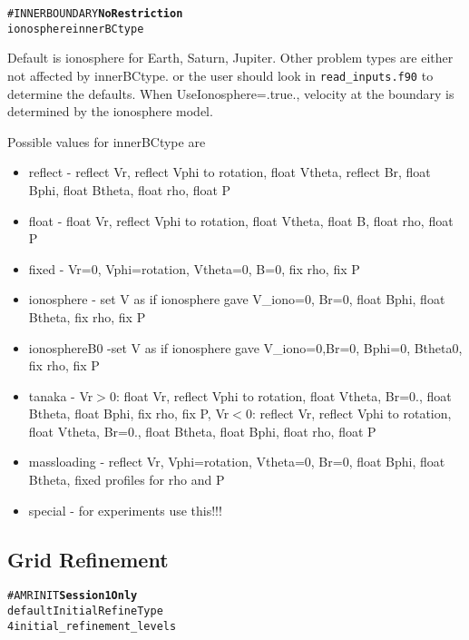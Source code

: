 \begin{alltt}
#INNERBOUNDARY \hfill {\bf No Restriction}
ionosphere             innerBCtype 
\end{alltt}

Default is ionosphere for  Earth, Saturn, Jupiter.  Other problem types are 
either not affected by innerBCtype. or the user should look in {\tt read\_inputs.f90}
to determine the defaults.  When UseIonosphere=.true., 
velocity at the boundary is determined by the ionosphere model.

Possible values for innerBCtype are

\begin{itemize}
\setlength{\itemsep}{0.0 in}
\item reflect - reflect Vr, reflect Vphi to rotation, float Vtheta,
reflect Br, float Bphi, float Btheta, float rho, float P
\item float - float Vr, reflect Vphi to rotation, float Vtheta, float B, float rho, float P
\item fixed - Vr=0, Vphi=rotation, Vtheta=0, B=0, fix rho, fix P
\item ionosphere - set V as if ionosphere gave V\_iono=0, Br=0, float Bphi, float Btheta, fix rho, fix P
\item ionosphereB0 -set V as if ionosphere gave V\_iono=0,Br=0, Bphi=0, Btheta0, fix rho, fix P
\item tanaka - Vr$>$0: float Vr, reflect Vphi to rotation, float Vtheta, Br=0., float Btheta, float Bphi, fix rho, fix P, Vr$<$0: reflect Vr, reflect Vphi to rotation, float Vtheta, Br=0., float Btheta, float Bphi, float rho, float P
\item massloading - reflect Vr, Vphi=rotation, Vtheta=0, Br=0, float Bphi, float Btheta, fixed profiles for rho and P
\item special - for experiments use this!!!
\end{itemize}


\subsection{Grid Refinement \label{section:grid_refinement}}

\begin{alltt}
#AMRINIT           \hfill {\bf Session 1 Only}
default                InitialRefineType
4                      initial_refinement_levels
\end{alltt}

